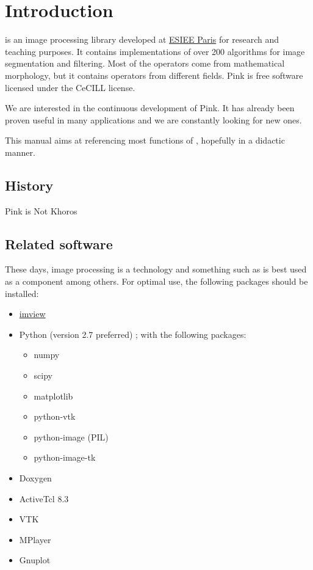 \chapter{Introduction}\label{chap:introduction}

\Pink is an image processing library developed at \href {http://www.esiee.fr}{ESIEE
  Paris} for research and teaching purposes. It
contains implementations of over 200 algorithms for image segmentation and
filtering. Most of the operators come from mathematical morphology, but it
contains operators from different fields. Pink is free software licensed under
the CeCILL license.

We are interested in the continuous development of Pink. It has already been
proven useful in many applications and we are constantly looking for new ones.

This manual aims at referencing most functions of \Pink, hopefully in a didactic manner.

\section*{History}
Pink is Not Khoros

\section*{Related software}
These days, image processing is a technology and something such as \Pink is best
used as a component among others. For optimal use, the following packages should
be installed:

\begin{itemize}
\item \href {http://www.sf.net/projects/imview}{imview}
\item Python (version 2.7 preferred) ; with the following packages:
  \begin{itemize}
  \item numpy
  \item scipy
  \item matplotlib
  \item python-vtk
  \item python-image (PIL)
 \item python-image-tk
  \end{itemize}
\item Doxygen
\item ActiveTcl 8.3
\item VTK
\item MPlayer
\item Gnuplot
\end{itemize}

